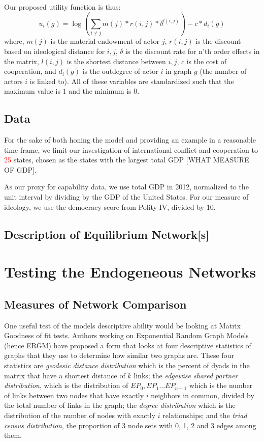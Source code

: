 \documentclass[12pt,onesided,fullpage]{amsart}
\begin{document}
Our proposed utility function is thus:
\begin{equation}
u_{i}(g) = \log (\sum_{i \neq j}  m(j)*r(i,j)*\delta^{l(i,j)}) - c*d_{i}(g)
\end{equation}
where, $m(j)$ is the material endowment of actor $j$, $r(i,j)$ is the discount based on ideological distance for $i, j$, $\delta$ is the discount rate for n'th order effects in the matrix, $l(i,j)$ is the shortest distance between $i, j$, $c$ is the cost of cooperation, and $d_{i}(g)$ is the outdegree of actor $i$ in graph $g$ (the number of actors $i$ is linked to). All of these variables are standardized such that the maximum value is $1$ and the minimum is $0$.

\subsection{Data}
For the sake of both honing the model and providing an example in a reasonable time frame, we limit our investigation of international conflict and cooperation to \textcolor{red}{25} states, chosen as the states with the largest total GDP [WHAT MEASURE OF GDP]. 

As our proxy for capability data, we use total GDP in 2012, normalized to the unit interval by dividing by the GDP of the United States. For our measure of ideology, we use the democracy score from Polity IV, divided by 10.
\subsection{Description of Equilibrium Network[s]}


\section{Testing the Endogeneous Networks}
\subsection{Measures of Network Comparison}
One useful test of the models descriptive ability would be looking at Matrix Goodness of fit tests. Authors working on Exponential Random Graph Models (hence ERGM) have proposed a form that looks at four descriptive statistics of graphs that they use to determine how similar two graphs are. These four statistics are \emph{geodesic distance distribution} which is the percent of dyads in the matrix that have a shortest distance of $k$ links; the \emph{edgewise shared partner distribution}, which is the distribution of $EP_0, EP_1...EP_{n-1}$ which is the number of links between two nodes that have exactly $i$ neighbors in common, divided by the total number of links in the graph; the \emph{degree distribution} which is the distribution of the number of nodes with exactly $i$ relationships; and the \emph{triad census distribution}, the proportion of 3 node sets with 0, 1, 2 and 3 edges among them.
\end{document}
